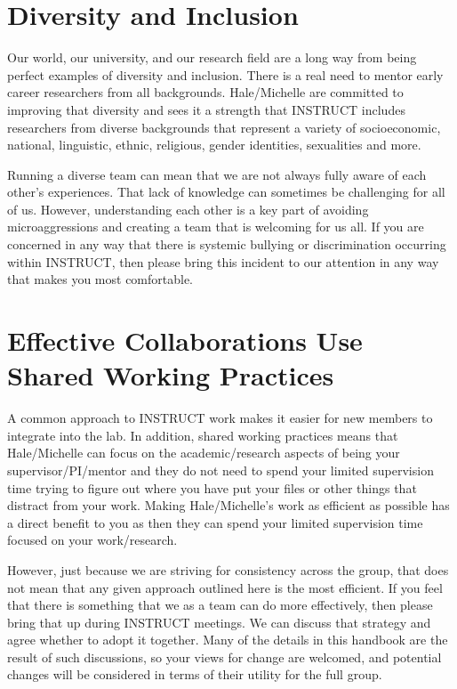 \documentclass[
]{book}
\theoremstyle{definition}
\theoremstyle{definition}
\theoremstyle{definition}
\theoremstyle{definition}
\theoremstyle{remark}
\begin{document}
\section{Diversity and Inclusion}\label{diversity-and-inclusion}

Our world, our university, and our research field are a long way from being perfect examples of diversity and inclusion. There is a real need to mentor early career researchers from all backgrounds. Hale/Michelle are committed to improving that diversity and sees it a strength that INSTRUCT includes researchers from diverse backgrounds that represent a variety of socioeconomic, national, linguistic, ethnic, religious, gender identities, sexualities and more.

Running a diverse team can mean that we are not always fully aware of each other's experiences. That lack of knowledge can sometimes be challenging for all of us. However, understanding each other is a key part of avoiding microaggressions and creating a team that is welcoming for us all. If you are concerned in any way that there is systemic bullying or discrimination occurring within INSTRUCT, then please bring this incident to our attention in any way that makes you most comfortable.

\section{Effective Collaborations Use Shared Working Practices}\label{effective-collaborations-use-shared-working-practices}

A common approach to INSTRUCT work makes it easier for new members to integrate into the lab. In addition, shared working practices means that Hale/Michelle can focus on the academic/research aspects of being your supervisor/PI/mentor and they do not need to spend your limited supervision time trying to figure out where you have put your files or other things that distract from your work. Making Hale/Michelle's work as efficient as possible has a direct benefit to you as then they can spend your limited supervision time focused on your work/research.

However, just because we are striving for consistency across the group, that does not mean that any given approach outlined here is the most efficient. If you feel that there is something that we as a team can do more effectively, then please bring that up during INSTRUCT meetings. We can discuss that strategy and agree whether to adopt it together. Many of the details in this handbook are the result of such discussions, so your views for change are welcomed, and potential changes will be considered in terms of their utility for the full group.
\end{document}
